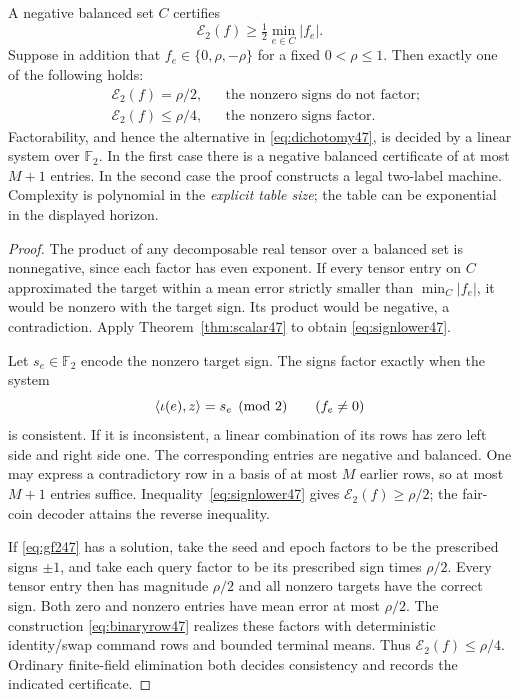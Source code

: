 \begin{theorem}\label{thm:sign47}
A negative balanced set $C$ certifies
\begin{equation}\label{eq:signlower47}
 \mathcal E_2(f)\ge\tfrac12\min_{e\in C}|f_e|.
\end{equation}
Suppose in addition that $f_e\in\{0,\rho,-\rho\}$ for a fixed
$0<\rho\le1$. Then exactly one of the following holds:
\begin{equation}\label{eq:dichotomy47}
 \begin{aligned}
 &\mathcal E_2(f)=\rho/2,
       &&\text{the nonzero signs do not factor;}\\
 &\mathcal E_2(f)\le\rho/4,
       &&\text{the nonzero signs factor.}
 \end{aligned}
\end{equation}
Factorability, and hence the alternative in \eqref{eq:dichotomy47},
is decided by a linear system over $\mathbb F_2$. In the first case
there is a negative balanced certificate of at most $M+1$ entries.
In the second case the proof constructs a legal two-label machine.
Complexity is polynomial in the \emph{explicit table size}; the table
can be exponential in the displayed horizon.
\end{theorem}
\begin{proof}
The product of any decomposable real tensor over a balanced set is
nonnegative, since each factor has even exponent. If every tensor
entry on $C$ approximated the target within a mean error strictly
smaller than $\min_C|f_e|$, it would be nonzero with the target sign.
Its product would be negative, a contradiction. Apply
Theorem~\ref{thm:scalar47} to obtain \eqref{eq:signlower47}.

Let $s_e\in\mathbb F_2$ encode the nonzero target sign. The signs
factor exactly when the system
\begin{equation}\label{eq:gf247}
 \langle\iota(e),z\rangle=s_e \pmod2\qquad(f_e\ne0)
\end{equation}
is consistent. If it is inconsistent, a linear combination of its
rows has zero left side and right side one. The corresponding entries
are negative and balanced. One may express a contradictory row in a
basis of at most $M$ earlier rows, so at most $M+1$ entries suffice.
Inequality~\eqref{eq:signlower47} gives $\mathcal E_2(f)\ge\rho/2$;
the fair-coin decoder attains the reverse inequality.

If \eqref{eq:gf247} has a solution, take the seed and epoch factors
to be the prescribed signs $\pm1$, and take each query factor to be
its prescribed sign times $\rho/2$. Every tensor entry then has
magnitude $\rho/2$ and all nonzero targets have the correct sign.
Both zero and nonzero entries have mean error at most $\rho/2$.
The construction \eqref{eq:binaryrow47} realizes these factors with
deterministic identity/swap command rows and bounded terminal means.
Thus $\mathcal E_2(f)\le\rho/4$. Ordinary finite-field elimination
both decides consistency and records the indicated certificate.
\end{proof}

